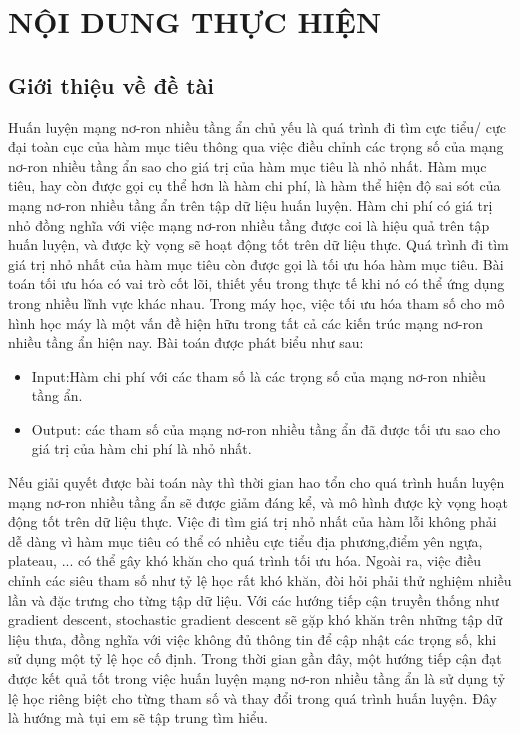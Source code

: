 \documentclass{article}[14pt]
\begin{document}
    \section{NỘI DUNG THỰC HIỆN}
    {

    
    \subsection{Giới thiệu về đề tài}
    
  Huấn luyện mạng nơ-ron nhiều tầng ẩn chủ yếu là quá trình đi tìm cực tiểu/ cực đại toàn cục của hàm mục tiêu thông qua việc điều chỉnh các trọng số của mạng nơ-ron nhiều tầng ẩn sao cho giá trị của hàm mục tiêu là nhỏ nhất. Hàm mục tiêu, hay còn được gọi cụ thể hơn là hàm chi phí, là hàm thể hiện độ sai sót của mạng nơ-ron nhiều tầng ẩn trên tập dữ liệu huấn luyện. Hàm  chi phí có giá trị nhỏ đồng nghĩa với việc mạng nơ-ron nhiều tầng được coi là hiệu quả trên tập huấn luyện, và được kỳ vọng sẽ hoạt động tốt trên dữ liệu thực. Quá trình đi tìm giá trị nhỏ nhất của hàm mục tiêu còn được gọi là tối ưu hóa hàm mục tiêu. Bài toán tối ưu hóa có vai trò cốt lõi, thiết yếu trong thực tế khi nó có thể ứng dụng trong nhiều lĩnh vực khác nhau. Trong máy học, việc tối ưu hóa tham số cho mô hình học máy là một vấn đề hiện hữu trong tất cả các kiến trúc mạng nơ-ron nhiều tầng ẩn hiện nay. Bài toán được phát biểu như sau:
   \begin{itemize}
      \item Input:Hàm chi phí với các tham số là các trọng số của mạng nơ-ron nhiều tầng ẩn.
      \item Output: các tham số của mạng nơ-ron nhiều tầng ẩn đã được tối ưu sao cho giá trị của hàm chi phí là nhỏ nhất.
    \end{itemize}
    
   Nếu giải quyết được bài toán này thì thời gian hao tổn cho quá trình huấn luyện mạng nơ-ron nhiều tầng ẩn sẽ được giảm đáng kể, và mô hình được kỳ vọng hoạt động tốt trên dữ liệu thực. Việc đi tìm giá trị nhỏ nhất của hàm lỗi không phải dễ dàng vì hàm mục tiêu có thể có nhiều cực tiểu địa phương,điểm yên ngựa, plateau, ... có thể gây khó khăn cho quá trình tối ưu hóa. Ngoài ra, việc điều chỉnh các siêu tham số như tỷ lệ học rất khó khăn, đòi hỏi phải thử nghiệm nhiều lần và đặc trưng cho từng tập dữ liệu. Với các hướng tiếp cận truyền thống như gradient descent, stochastic gradient descent sẽ gặp khó khăn trên những tập dữ liệu thưa, đồng nghĩa với việc không đủ thông tin để cập nhật các trọng số, khi sử dụng một tỷ lệ học cố định.
   Trong thời gian gần đây, một hướng tiếp cận đạt được kết quả tốt trong việc huấn luyện mạng nơ-ron nhiều tầng ẩn là sử dụng tỷ lệ học riêng biệt cho từng tham số và thay đổi trong quá trình huấn luyện. Đây là hướng mà tụi em sẽ tập trung tìm hiểu.
    
}
\end{document}
